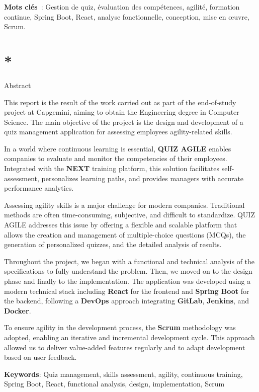 \documentclass[12pt,a4paper,twoside,openright]{report}
\let\origchapter\chapter
\renewcommand{\chapter}[1]{%
  \cleardoublepage%
  \origchapter{#1}%
}
\begin{document}
\textbf{Mots clés}~: Gestion de quiz, évaluation des compétences,
agilité, formation continue, Spring Boot, React, analyse fonctionnelle,
conception, mise en œuvre, Scrum.

\chapter*{Abstract}

This report is the result of the work carried out as part of the
end-of-study project at Capgemini, aiming to obtain the Engineering
degree in Computer Science. The main objective of the project is the
design and development of a quiz management application for assessing
employees\textquotesingle{} agility-related skills.

In a world where continuous learning is essential, \textbf{QUIZ AGILE}
enables companies to evaluate and monitor the competencies of their
employees. Integrated with the \textbf{NEXT} training platform, this
solution facilitates self-assessment, personalizes learning paths, and
provides managers with accurate performance analytics.

Assessing agility skills is a major challenge for modern companies.
Traditional methods are often time-consuming, subjective, and difficult
to standardize. QUIZ AGILE addresses this issue by offering a flexible
and scalable platform that allows the creation and management of
multiple-choice questions (MCQs), the generation of personalized
quizzes, and the detailed analysis of results.

Throughout the project, we began with a functional and technical
analysis of the specifications to fully understand the problem. Then, we
moved on to the design phase and finally to the implementation. The
application was developed using a modern technical stack including
\textbf{React} for the frontend and \textbf{Spring Boot} for the
backend, following a \textbf{DevOps} approach integrating
\textbf{GitLab}, \textbf{Jenkins}, and \textbf{Docker}.

To ensure agility in the development process, the \textbf{Scrum}
methodology was adopted, enabling an iterative and incremental
development cycle. This approach allowed us to deliver value-added
features regularly and to adapt development based on user feedback.

\textbf{Keywords}: Quiz management, skills assessment, agility,
continuous training, Spring Boot, React, functional analysis, design,
implementation, Scrum
\end{document}

